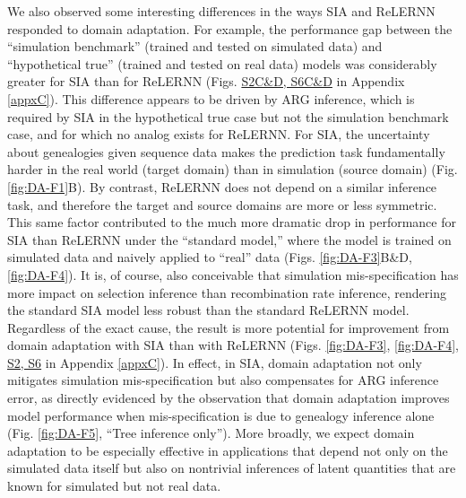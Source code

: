 We also observed some interesting differences in the ways \ac{SIA} and ReLERNN responded to domain adaptation. For example, the performance gap between the “simulation benchmark” (trained and tested on simulated data) and “hypothetical true” (trained and tested on real data) models was considerably greater for \ac{SIA} than for ReLERNN (Figs. \href{https://journals.plos.org/plosgenetics/article?id=10.1371/journal.pgen.1011032#sec018}{S2C\&D, S6C\&D} in Appendix \ref{appxC}). This difference appears to be driven by \ac{ARG} inference, which is required by \ac{SIA} in the hypothetical true case but not the simulation benchmark case, and for which no analog exists for ReLERNN. For \ac{SIA}, the uncertainty about genealogies given sequence data makes the prediction task fundamentally harder in the real world (target domain) than in simulation (source domain) (Fig. \ref{fig:DA-F1}B). By contrast, ReLERNN does not depend on a similar inference task, and therefore the target and source domains are more or less symmetric. This same factor contributed to the much more dramatic drop in performance for \ac{SIA} than ReLERNN under the “standard model,” where the model is trained on simulated data and naively applied to “real” data (Figs. \ref{fig:DA-F3}B\&D, \ref{fig:DA-F4}). It is, of course, also conceivable that simulation mis-specification has more impact on selection inference than recombination rate inference, rendering the standard \ac{SIA} model less robust than the standard ReLERNN model. Regardless of the exact cause, the result is more potential for improvement from domain adaptation with \ac{SIA} than with ReLERNN (Figs. \ref{fig:DA-F3}, \ref{fig:DA-F4}, \href{https://journals.plos.org/plosgenetics/article?id=10.1371/journal.pgen.1011032#sec018}{S2, S6} in Appendix \ref{appxC}). In effect, in \ac{SIA}, domain adaptation not only mitigates simulation mis-specification but also compensates for \ac{ARG} inference error, as directly evidenced by the observation that domain adaptation improves model performance when mis-specification is due to genealogy inference alone (Fig. \ref{fig:DA-F5}, “Tree inference only”). More broadly, we expect domain adaptation to be especially effective in applications that depend not only on the simulated data itself but also on nontrivial inferences of latent quantities that are known for simulated but not real data.

